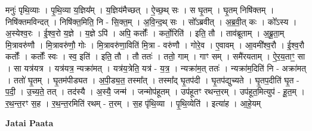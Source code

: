 \documentclass[17pt]{extarticle}
\begin{document}
मनुः॑ पृथि॒व्याः । पृ॒थि॒व्या य॒ज्ञिय᳚म् । य॒ज्ञिय॑मैच्छत् । ऐ॒च्छ॒थ् सः । स घृ॒तम् । घृ॒तम् निषि॑क्तम् । निषि॑क्तमविन्दत् । निषि॑क्त॒मिति॒ नि - सि॒क्त॒म् । अ॒वि॒न्द॒थ् सः । सो᳚ऽब्रवीत् । अ॒ब्र॒वी॒त् कः । को᳚ऽस्य । अ॒स्येश्व॒रः । ई॒श्व॒रो य॒ज्ञे । य॒ज्ञे ऽपि॑ । अपि॒ कर्तोः᳚ । कर्तो॒रिति॑ । इति॒ तौ । ताव॑ब्रूताम् । अ॒ब्रू॒ता॒म् मि॒त्रावरु॑णौ । मि॒त्रावरु॑णौ॒ गोः । मि॒त्रावरु॑णा॒विति॑ मि॒त्रा - वरु॑णौ । गोरे॒व । ए॒वावम् । आ॒वमी᳚श्व॒रौ । ई॒श्व॒रौ कर्तोः᳚ । कर्तोः᳚ स्वः । स्व॒ इति॑ । इति॒ तौ । तौ ततः॑ । ततो॒ गाम् । गाꣳ सम् । समै॑रयताम् । ऐ॒र॒य॒ताꣳ॒॒ सा । सा यत्र॑यत्र । यत्र॑यत्र॒ न्यक्रा॑मत् । यत्र॑य॒त्रेति॒ यत्र॑ - य॒त्र॒ । न्यक्रा॑म॒त् ततः॑ । न्यक्रा॑म॒दिति॑ नि - अक्रा॑मत् । ततो॑ घृ॒तम् । घृ॒तम॑पीड्यत । अ॒पी॒ड्य॒त॒ तस्मा᳚त् । तस्मा᳚द् घृ॒तप॑दी । घृ॒तप॑द्युच्यते । घृ॒तप॒दीति॑ घृ॒त - प॒दी॒ । उ॒च्य॒ते॒ तत् । तद॑स्यै । अ॒स्यै॒ जन्म॑ । जन्मोप॑हूतम् । उप॑हूतꣳ रथन्त॒रम् । उप॑हूत॒मित्युप॑ - हू॒त॒म् । र॒थ॒न्त॒रꣳ स॒ह । र॒थ॒न्त॒रमिति॑ रथम् - त॒रम् । स॒ह पृ॑थि॒व्या । पृ॒थि॒व्येति॑ । इत्या॑ह । आ॒हे॒यम् \newline

\textbf{Jatai Paata} \newline
\end{document}
